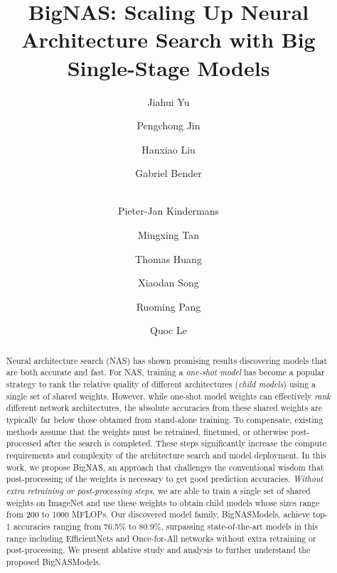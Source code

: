\documentclass[runningheads]{llncs}
\begin{document}
\pagestyle{headings}
\mainmatter

\title{BigNAS: Scaling Up Neural Architecture Search with Big Single-Stage Models}


\author{Jiahui Yu \and
Pengchong Jin \and
Hanxiao Liu \and
Gabriel Bender \and\\
Pieter-Jan Kindermans \and
Mingxing Tan \and
Thomas Huang \and
Xiaodan Song \and
Ruoming Pang \and
Quoc Le
}



\maketitle

\begin{abstract}
Neural architecture search (NAS) has shown promising results discovering models that are both accurate and fast. For NAS, training a \textit{one-shot model} has become a popular strategy to rank the relative quality of different architectures (\textit{child models}) using a single set of shared weights. However, while one-shot model weights can effectively \textit{rank} different network architectures, the absolute accuracies from these shared weights are typically far below those obtained from stand-alone training. To compensate, existing methods assume that the weights must be retrained, finetuned, or otherwise post-processed after the search is completed. These steps significantly increase the compute requirements and complexity of the architecture search and model deployment. In this work, we propose BigNAS, an approach that challenges the conventional wisdom that post-processing of the weights is necessary to get good prediction accuracies. \emph{Without extra retraining or post-processing steps}, we are able to train a single set of shared weights on ImageNet and use these weights to obtain child models whose sizes range from 200 to 1000 MFLOPs. Our discovered model family, BigNASModels, achieve top-1 accuracies ranging from 76.5\% to 80.9\%, surpassing state-of-the-art models in this range including EfficientNets and Once-for-All networks without extra retraining or post-processing. We present ablative study and analysis to further understand the proposed BigNASModels.
\end{abstract}
\end{document}
